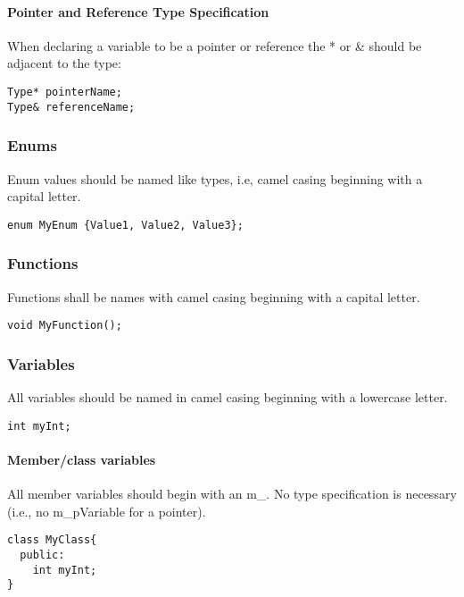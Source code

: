 \documentclass[12pt]{article}
\begin{document}
\paragraph{Pointer and Reference Type Specification}

When declaring a variable to be a pointer or reference the * or \& should be
adjacent to the type:

\begin{lstlisting}
Type* pointerName;
Type& referenceName;
\end{lstlisting}

\subsubsection{Enums}
Enum values should be named like types, i.e, camel casing beginning with a
capital letter.

\begin{lstlisting}
enum MyEnum {Value1, Value2, Value3};
\end{lstlisting}

\subsubsection{Functions}
Functions shall be names with camel casing beginning with a capital letter.

\begin{lstlisting}
void MyFunction();
\end{lstlisting}

\subsubsection{Variables}

All variables should be named in camel casing beginning with a lowercase letter.

\begin{lstlisting}
int myInt;
\end{lstlisting}

\paragraph{Member/class variables}

All member variables should begin with an m\_. No type specification is
necessary (i.e., no m\_pVariable for a pointer).


\begin{lstlisting}
class MyClass{
  public:
    int myInt;
}
\end{lstlisting}
\end{document}
